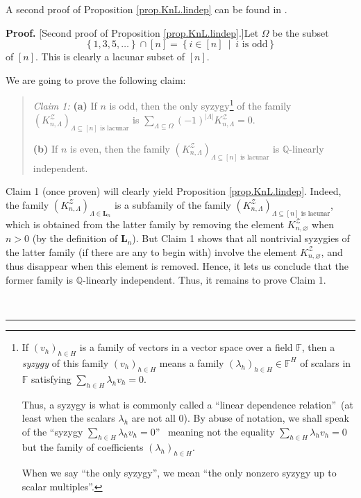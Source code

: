\documentclass[numbers=enddot,12pt,final,onecolumn,notitlepage]{scrartcl}%
\theoremstyle{definition}
\newenvironment{statement}{\begin{quote}}{\end{quote}}
\newenvironment{proof}[1][Proof]{\noindent\textbf{#1.} }{\ \rule{0.5em}{0.5em}}
\newenvironment{verlong}{}{}
\newenvironment{vershort}{}{}
\let\sumnonlimits\sum
\renewcommand{\sum}{\sumnonlimits\limits}
\begin{document}
\begin{vershort}
A second proof of Proposition \ref{prop.KnL.lindep} can be found in
\cite{verlong}.
\end{vershort}

\begin{verlong}
\begin{proof}
[Second proof of Proposition \ref{prop.KnL.lindep}.]Let $\Omega$ be the subset
\[
\left\{  1,3,5,\ldots\right\}  \cap\left[  n\right]  =\left\{  i\in\left[
n\right]  \ \mid\ i\text{ is odd}\right\}
\]
of $\left[  n\right]  $. This is
clearly a lacunar subset of $\left[  n\right]  $.

We are going to prove the following claim:

\begin{statement}
\textit{Claim 1:} \textbf{(a)} If $n$ is odd, then the only syzygy\footnote{If
$\left(  v_{h}\right)  _{h\in H}$ is a family of vectors in a vector space
over a field $\mathbb{F}$, then a \textit{syzygy} of this family $\left(
v_{h}\right)  _{h\in H}$ means a family $\left(  \lambda_{h}\right)  _{h\in
H}\in\mathbb{F}^{H}$ of scalars in $\mathbb{F}$ satisfying $\sum_{h\in
H}\lambda_{h}v_{h}=0$.
\par
Thus, a syzygy is what is commonly called a \textquotedblleft linear
dependence relation\textquotedblright\ (at least when the scalars $\lambda
_{h}$ are not all $0$). By abuse of notation, we shall speak of the
\textquotedblleft syzygy $\sum_{h\in H}\lambda_{h}v_{h}=0$\textquotedblright%
\ meaning not the equality $\sum_{h\in H}\lambda_{h}v_{h}=0$ but the family of
coefficients $\left(  \lambda_{h}\right)  _{h\in H}$.
\par
When we say \textquotedblleft the only syzygy\textquotedblright, we mean
\textquotedblleft the only nonzero syzygy up to scalar
multiples\textquotedblright.} of the family
$\left(  K_{n,\Lambda }^{\mathcal{Z}}\right) %
_{\Lambda\subseteq\left[  n\right]  \text{ is lacunar}}$
is $\sum_{\Lambda\subseteq\Omega}\left(  -1\right)  ^{\left\vert
\Lambda\right\vert }K_{n,\Lambda}^{\mathcal{Z}}=0$.

\textbf{(b)} If $n$ is even, then the family $\left(  K_{n,\Lambda
}^{\mathcal{Z}}\right)  _{\Lambda\subseteq\left[  n\right]  \text{ is
lacunar}}$ is $\mathbb{Q}$-linearly independent.
\end{statement}

Claim 1 (once proven) will clearly yield
Proposition \ref{prop.KnL.lindep}. Indeed, the family
$\left(  K_{n,\Lambda}^{\mathcal{Z}}\right)  _{\Lambda\in \mathbf{L}_n}$
is a subfamily of the family
$\left(  K_{n,\Lambda }^{\mathcal{Z}}\right) %
_{\Lambda\subseteq\left[  n\right]  \text{ is lacunar}}$,
which is obtained from the latter family by removing the element
$K_{n,\varnothing}^{\mathcal{Z}}$ when $n > 0$ (by the definition
of $\mathbf{L}_n$).
But Claim 1 shows that all nontrivial syzygies of the latter family
(if there are any to begin with) involve the element
$K_{n,\varnothing}^{\mathcal{Z}}$, and thus disappear when this
element is removed.
Hence, it lets us conclude that the former family is
$\mathbb{Q}$-linearly independent.
Thus, it remains to prove Claim 1.


\end{proof}
\end{verlong}
\end{document}
